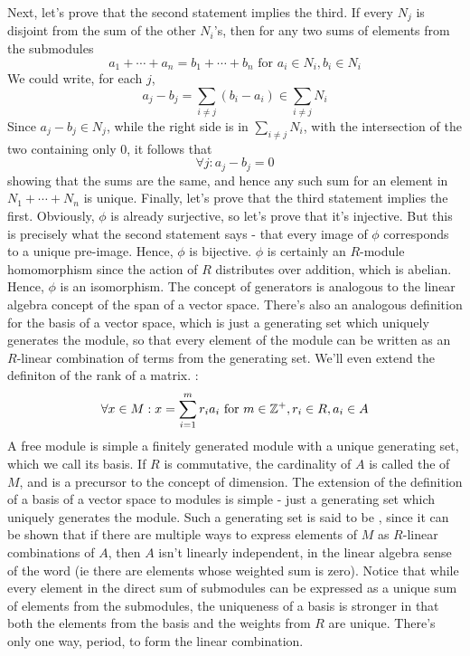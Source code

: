 \documentclass{article}
\begin{document}
\n
Next, let's prove that the second statement implies the third. If every $ N_j $ is disjoint from the sum of the other $ N_i $'s, then for any two sums of elements from the submodules
$$ a_1 + \cdots + a_n = b_1 + \cdots + b_n \text{ for } a_i \in N_i, b_i \in N_i $$
We could write, for each $ j $,
$$ a_j - b_j = \sum_{i \neq j} (b_i - a_i) \in \sum_{i \neq j} N_i $$
Since $ a_j - b_j \in N_j $, while the right side is in $ \sum_{i \neq j} N_i $, with the intersection of the two containing only 0, it follows that
$$ \forall j: a_j - b_j = 0 $$
showing that the sums are the same, and hence any such sum for an element in $ N_1 + \cdots + N_n $ is unique.
\n
Finally, let's prove that the third statement implies the first. Obviously, $ \phi $ is already surjective, so let's prove that it's injective. But this is precisely what the second statement says - that every image of $ \phi $ corresponds to a unique pre-image. Hence, $ \phi $ is bijective. $ \phi $ is certainly an $ R $-module homomorphism since the action of $ R $ distributes over addition, which is abelian. Hence, $ \phi $ is an isomorphism. \qedsymbol 
\nn
The concept of generators is analogous to the linear algebra concept of the span of a vector space. There's also an analogous definition for the basis of a vector space, which is just a generating set which uniquely generates the module, so that every element of the module can be written as an $ R $-linear combination of terms from the generating set. We'll even extend the definiton of the rank of a matrix.
\nn
{}: 
$$ \forall x \in M: x = \sum_{i = 1}^m r_i a_i \text{ for } m \in \mathbb{Z}^+, r_i \in R, a_i \in A $$
\indent {}
\n
A free module is simple a finitely generated module with a unique generating set, which we call its basis. If $ R $ is commutative, the cardinality of $ A $ is called the  of $ M $, and is a precursor to the concept of dimension. The extension of the definition of a basis of a vector space to modules is simple - just a generating set which uniquely generates the module. Such a generating set is said to be , since it can be shown that if there are multiple ways to express elements of $ M $ as $ R $-linear combinations of $ A $, then $ A $ isn't linearly independent, in the linear algebra sense of the word (ie there are elements whose weighted sum is zero). Notice that while every element in the direct sum of submodules can be expressed as a unique sum of elements from the submodules, the uniqueness of a basis is stronger in that both the elements from the basis and the weights from $ R $ are unique. There's only one way, period, to form the linear combination.
\end{document}
